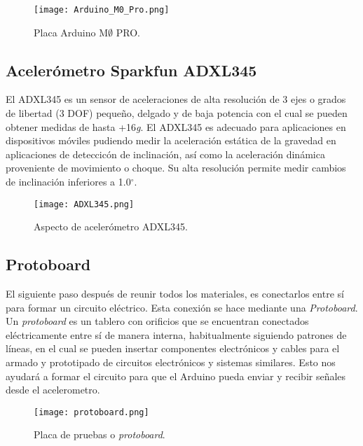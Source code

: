 \documentclass[10pt, a4paper, twocolumn]{article} %
\begin{document}
\begin{figure}[h]
	\begin{center}
		\texttt{[image: Arduino\_M0\_Pro.png]} %
		\caption{Placa Arduino M$\emptyset$ PRO.} %
		\label{fg:arduino}
	\end{center}
\end{figure}



\subsection{Acelerómetro Sparkfun ADXL345}

El ADXL345 es un sensor de aceleraciones de alta resolución de 3 ejes o grados de libertad (3 DOF) pequeño, delgado y de baja potencia con el cual se pueden obtener medidas de hasta +16\textit{g}. El ADXL345 es adecuado para aplicaciones en dispositivos móviles pudiendo medir la aceleración estática de la gravedad en aplicaciones de deteccicón de inclinación, as\'i como la aceleración dinámica proveniente de movimiento o choque. Su alta resolución permite medir cambios de inclinación inferiores a 1.0$^{\circ}$.

\begin{figure}[h]
	\begin{center}
		\texttt{[image: ADXL345.png]} %
		\caption{Aspecto de acelerómetro ADXL345.} %
		\label{fg:adxl345}
	\end{center}
\end{figure}

\subsection{Protoboard}

El siguiente paso después de reunir todos los materiales, es conectarlos entre s\'i para formar un circuito eléctrico. Esta conexión se hace mediante una \textit{Protoboard}. Un \textit{protoboard} es un tablero con orificios que se encuentran conectados eléctricamente entre sí de manera interna, habitualmente siguiendo patrones de líneas, en el cual se pueden insertar componentes electrónicos y cables para el armado y prototipado de circuitos electrónicos y sistemas similares. Esto nos ayudará a formar el circuito para que el Arduino pueda enviar y recibir señales desde el acelerometro.

\begin{figure}[h]
	\begin{center}
		\texttt{[image: protoboard.png]} %
		\caption{Placa de pruebas o \textit{protoboard}.} %
		\label{fg:protoboard}
	\end{center}
\end{figure}
\end{document}
